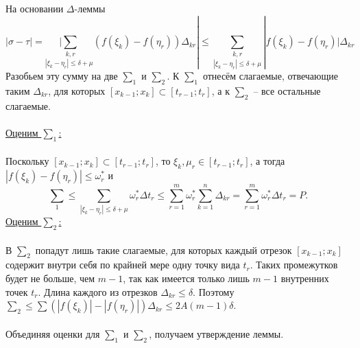 \begin{Proof}
	На основании $\Delta$-леммы
	$$|\sigma - \tau| = \underset{|\xi_k - \eta_r| \le \delta + \mu}{|\sum_{k, r}}(f(\xi_k) - f(\eta_r))\Delta_{kr}| \le \underset{|\xi_k - \eta_r| \le \delta + \mu}{\sum_{k, r}}|f(\xi_k) - f(\eta_r)|\Delta_{kr}$$
	Разобьем эту сумму на две ${\sum}_1$ и ${\sum}_2$. К ${\sum}_1$ отнесём слагаемые, отвечающие таким $\Delta_{kr}$, для которых $[x_{k-1}; x_k]\subset[t_{r-1}; t_r]$, а к ${\sum}_2$ -- все остальные слагаемые.\\\\
	\underline{Оценим ${\sum}_1$:}\\\\
	Поскольку $[x_{k-1}; x_k]\subset[t_{r-1}; t_r]$, то $\xi_k, \mu_r \in [t_{r-1}; t_r]$, а тогда $|f(\xi_k) - f(\eta_r)| \le \omega_r^*$ и $${\sum}_1 \le \underset{|\xi_k - \eta_r| \le \delta + \mu}{\sum} \omega_r^* \Delta t_r \le \sum_{r=1}^{m}\omega_r^* \sum_{k=1}^{n}\Delta_{kr} = \sum_{r=1}^{m}\omega_r^* \Delta t_r  = P.$$
	\underline{Оценим ${\sum}_2$:}\\\\
	В ${\sum}_2$ попадут лишь такие слагаемые, для которых каждый отрезок $[x_{k-1}; x_k]$ содержит внутри себя по крайней мере одну точку вида $t_r$. Таких промежутков будет не больше, чем $m - 1$, так как имеется только лишь $m - 1$ внутренних точек $t_r$. Длина каждого из отрезков $\Delta_{kr} \le \delta$. Поэтому ${\sum}_2 \le \sum(|f(\xi_k)| - |f(\eta_r)|)\Delta_{kr} \le 2A(m - 1)\delta$.\\\\
	Объединяя оценки для ${\sum}_1$ и ${\sum}_2$, получаем утверждение леммы.
\end{Proof}
